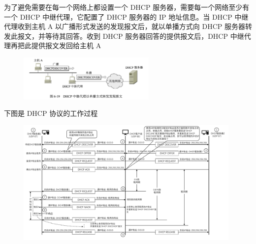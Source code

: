 \documentclass[cs4size,a4paper,10pt]{ctexart}
\begin{document}
	为了避免需要在每一个网络上都设置一个 DHCP 服务器，需要每一个网络至少有一个 DHCP 中继代理，它配置了 DHCP 服务器的 IP 地址信息。当 DHCP 中继代理收到主机 A 以广播形式发送的发现报文后，就以单播方式向 DHCP 服务器转发此报文，并等待其回答。收到 DHCP 服务器回答的提供报文后，DHCP 中继代理再把此提供报文发回给主机 A

	\begin{figure}[H]
		\centering
		\includegraphics[width=0.6\textwidth]{img/6.19}
	\end{figure}

	下图是 DHCP 协议的工作过程
	\begin{figure}[H]
		\centering
		\includegraphics[width=0.98\textwidth]{img/6.6}
	\end{figure}
\end{document}
